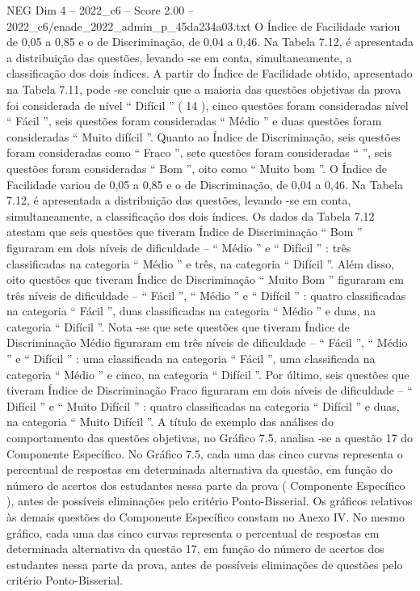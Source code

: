 \begin{textsample}{NEG Dim 4 – 2022\_c6 – Score 2.00 – 2022\_c6/enade\_2022\_admin\_p\_45da234a03.txt}
O Índice de Facilidade variou de 0,05 a 0,85 e o de Discriminação, de 0,04 a 0,46.
Na Tabela 7.12, é apresentada a distribuição das questões, levando -se em conta, simultaneamente, a classificação dos dois índices.
A partir do Índice de Facilidade obtido, apresentado na Tabela 7.11, pode -se concluir que a maioria das questões objetivas da prova foi considerada de nível “ Difícil ” ( 14 ), cinco questões foram consideradas nível “ Fácil ”, seis questões foram consideradas “ Médio ” e duas questões foram consideradas “ Muito difícil ”.
Quanto ao Índice de Discriminação, seis questões foram consideradas como “ Fraco ”, sete questões foram consideradas “ ”, seis questões foram consideradas “ Bom ”, oito como “ Muito bom ”.
O Índice de Facilidade variou de 0,05 a 0,85 e o de Discriminação, de 0,04 a 0,46.
Na Tabela 7.12, é apresentada a distribuição das questões, levando -se em conta, simultaneamente, a classificação dos dois índices.
Os dados da Tabela 7.12 atestam que seis questões que tiveram Índice de Discriminação “ Bom ” figuraram em dois níveis de dificuldade – “ Médio ” e “ Difícil ” : três classificadas na categoria “ Médio ” e três, na categoria “ Difícil ”.
Além disso, oito questões que tiveram Índice de Discriminação “ Muito Bom ” figuraram em três níveis de dificuldade – “ Fácil ”, “ Médio ” e “ Difícil ” : quatro classificadas na categoria “ Fácil ”, duas classificadas na categoria “ Médio ” e duas, na categoria “ Difícil ”.
Nota -se que sete questões que tiveram Índice de Discriminação Médio figuraram em três níveis de dificuldade – “ Fácil ”, “ Médio ” e “ Difícil ” : uma classificada na categoria “ Fácil ”, uma classificada na categoria “ Médio ” e cinco, na categoria “ Difícil ”.
Por último, seis questões que tiveram Índice de Discriminação Fraco figuraram em dois níveis de dificuldade – “ Difícil ” e “ Muito Difícil ” : quatro classificadas na categoria “ Difícil ” e duas, na categoria “ Muito Difícil ”.
A título de exemplo das análises do comportamento das questões objetivas, no Gráfico 7.5, analisa -se a questão 17 do Componente Específico.
No Gráfico 7.5, cada uma das cinco curvas representa o percentual de respostas em determinada alternativa da questão, em função do número de acertos dos estudantes nessa parte da prova ( Componente Específico ), antes de possíveis eliminações pelo critério Ponto-Bisserial.
Os gráficos relativos às demais questões do Componente Específico constam no Anexo IV.
No mesmo gráfico, cada uma das cinco curvas representa o percentual de respostas em determinada alternativa da questão 17, em função do número de acertos dos estudantes nessa parte da prova, antes de possíveis eliminações de questões pelo critério Ponto-Bisserial.

\end{textsample}
